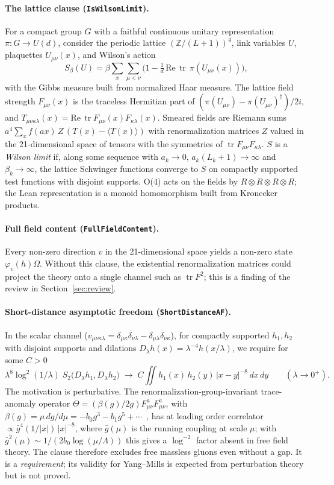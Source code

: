 \documentclass[11pt]{article}
\theoremstyle{definition}
\theoremstyle{remark}
\newcommand{\tr}{\operatorname{tr}}
\newcommand{\lean}[1]{\texttt{\hyphenchar\font=-1\relax #1}}
\begin{document}
\paragraph{The lattice clause (\lean{IsWilsonLimit}).}
For a compact group $G$ with a faithful continuous unitary representation $\pi:G\to U(d)$,
consider the periodic lattice $(\mathbb{Z}/(L+1))^4$, link variables $U$, plaquettes
$U_{\mu\nu}(x)$, and Wilson's action~\cite{Wilson1974}
\[
S_\beta(U)=\beta\sum_x\sum_{\mu<\nu}\Big(1-\tfrac1d\,\mathrm{Re}\,\tr\,\pi(U_{\mu\nu}(x))\Big),
\]
with the Gibbs measure built from normalized Haar measure. The lattice field strength
$F_{\mu\nu}(x)$ is the traceless Hermitian part of $(\pi(U_{\mu\nu})-\pi(U_{\mu\nu})^\dagger)/2i$,
and $T_{\mu\nu\kappa\lambda}(x)=\mathrm{Re}\,\tr F_{\mu\nu}(x)F_{\kappa\lambda}(x)$. Smeared
fields are Riemann sums $a^4\sum_x f(ax)\,Z\,(T(x)-\langle T(x)\rangle)$ with renormalization
matrices $Z$ valued in the 21-dimensional space of tensors with the symmetries of
$\tr F_{\mu\nu}F_{\kappa\lambda}$. $S$ is a \emph{Wilson limit} if, along some sequence with
$a_k\to0$, $a_k(L_k+1)\to\infty$ and $\beta_k\to\infty$, the lattice Schwinger functions
converge to $S$ on compactly supported test functions with disjoint supports. O(4) acts on the
fields by $R\otimes R\otimes R\otimes R$; the Lean representation is a monoid homomorphism built
from Kronecker products.

\paragraph{Full field content (\lean{FullFieldContent}).}
Every non-zero direction $v$ in the 21-dimensional space yields a non-zero state
$\varphi_v(h)\Omega$. Without this clause, the existential renormalization matrices could project
the theory onto a single channel such as $\tr F^2$; this is a finding of the review in
Section~\ref{sec:review}.

\paragraph{Short-distance asymptotic freedom (\lean{ShortDistanceAF}).}
In the scalar channel ($v_{\mu\nu\kappa\lambda}=\delta_{\mu\kappa}\delta_{\nu\lambda}-\delta_{\mu\lambda}\delta_{\nu\kappa}$),
for compactly supported $h_1,h_2$ with disjoint supports and dilations
$D_\lambda h(x)=\lambda^{-4}h(x/\lambda)$, we require for some $C>0$
\[
\lambda^8\log^2(1/\lambda)\;S_2\big(D_\lambda h_1,D_\lambda h_2\big)\;\longrightarrow\;
C\iint h_1(x)\,h_2(y)\,|x-y|^{-8}\,dx\,dy\qquad(\lambda\to0^+).
\]
The motivation is perturbative. The renormalization-group-invariant trace-anomaly operator
$\Theta=(\beta(g)/2g)F^a_{\mu\nu}F^a_{\mu\nu}$, with $\beta(g)=\mu\,dg/d\mu=-b_0g^3-b_1g^5+\cdots$~\cite{Collins1977},
has at leading order correlator $\propto\bar g^4(1/|x|)\,|x|^{-8}$, where $\bar g(\mu)$ is the
running coupling at scale $\mu$; with $\bar g^2(\mu)\sim 1/(2b_0\log(\mu/\Lambda))$ this gives a
$\log^{-2}$ factor absent in free field theory. The clause therefore excludes free massless gluons even without a gap. It is a
\emph{requirement}; its validity for Yang--Mills is expected from perturbation theory but is
not proved.
\end{document}
